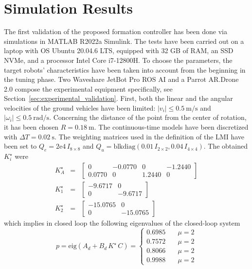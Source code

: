 \documentclass{ifacconf}
\begin{document}
\section{Simulation Results}
\label{sec:simulation_results}
The first validation of the proposed formation 
controller has been done via simulations in MATLAB R2022a Simulink.
The tests have been carried out on a laptop with OS Ubuntu 20.04.6 LTS, 
equipped with 32 GB of RAM, an SSD NVMe, and a processor Intel Core i7-12800H.
To choose the parameters, the target robots' characteristics 
have been taken into account from the beginning 
in the tuning phase.
Two Waveshare JetBot Pro ROS AI and a Parrot AR.Drone 2.0 
compose the experimental equipment specifically, 
see Section~\ref{sec:experimental_validation}.
First, both the linear and the angular velocities 
of the ground vehicles have been limited: 
$\left\lvert v_i \right\rvert \leq \SI{0.5}{\meter\per\second}$ and 
$\left\lvert \omega_i\right\rvert \leq \SI{0.5}{\radian\per\second}$.
Concerning the distance of the point from the center of rotation, 
it has been chosen $R = \SI{0.18}{\meter}$.
The continuous-time models have been 
discretized with
$\Delta T = \SI{0.02}{\second}$.
The weighting matrices used in the definition 
of the LMI have been set to 
$Q_e = 2\mathrm{e}4 \, I_{8 \times 8}$ and 
$Q_u =\text{blkdiag}(0.01 \, I_{2\times2}, 0.04 \, I_{4\times4})$.
The obtained $K^\star_i$ were 
\begin{eqnarray}
    K^\star_A &=& \begin{bmatrix}
        0  &  -0.0770    &     0  &  -1.2440 \\
        0.0770 &     0       & 1.2440 &      0
    \end{bmatrix}\\
    K^\star_1 &=& \begin{bmatrix}
        -9.6717 & 0 \\
         0   & -9.6717
    \end{bmatrix}\\
    K^\star_2 &=& \begin{bmatrix}
        -15.0765 & 0 \\
         0   & -15.0765
    \end{bmatrix}
\end{eqnarray}
which implies in closed loop the following 
eigenvalues of the closed-loop system
\begin{equation}
    p = \text{eig}(A_d + B_d \, K^\star \, C) = 
    \begin{cases}
        0.6985 \quad & \mu = 2\\
        0.7572 \quad & \mu = 2\\
        0.8066 \quad & \mu = 2\\
        0.9988 \quad  &   \mu = 2
    \end{cases}
\end{equation}
\end{document}
